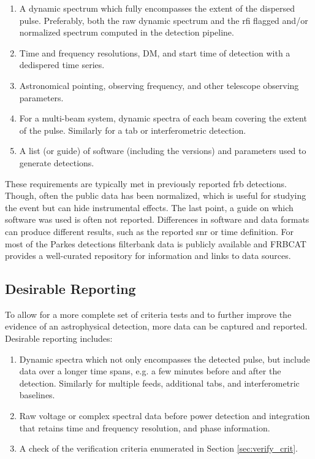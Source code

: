 \documentclass[a4paper,fleqn,usenatbib]{mnras}
\begin{document}
\begin{enumerate}
    \item A dynamic spectrum which fully encompasses the extent of the dispersed
    pulse. Preferably, both the raw dynamic spectrum and the \gls{rfi} flagged
    and/or normalized spectrum computed in the detection pipeline.
    \item Time and frequency resolutions, DM, and start time of detection with a
    dedispered time series.
    \item Astronomical pointing, observing frequency, and other telescope
    observing parameters.
    \item For a multi-beam system, dynamic spectra of each beam covering the
    extent of the pulse. Similarly for a \gls{tab} or interferometric detection.
    \item A list (or guide) of software (including the versions) and parameters used
    to generate detections.
\end{enumerate}


These requirements are typically met in previously reported \gls{frb}
detections. Though, often the public data has been normalized, which is useful
for studying the event but can hide instrumental effects.  The last point,
a guide on which software was used is often not reported.  Differences in
software and data formats can produce different results, such as the reported
\gls{snr} or time definition. For most of the Parkes detections filterbank data
is publicly available and FRBCAT \citep{2016PASA...33...45P} provides a
well-curated repository for information and links to data sources.

\subsection{Desirable Reporting}

To allow for a more complete set of criteria tests and to further improve the
evidence of an astrophysical detection, more data can be captured and reported.
Desirable reporting includes:


\begin{enumerate}
    \item Dynamic spectra which not only encompasses the detected pulse, but
    include data over a longer time spans, e.g. a few minutes before and after
    the detection. Similarly for multiple feeds, additional \glspl{tab}, and
    interferometric baselines.
    \item Raw voltage or complex spectral data before power detection and
    integration that retains time and frequency resolution, and phase
    information.
    \item A check of the verification criteria enumerated in Section
    \ref{sec:verify_crit}.
\end{enumerate}
\end{document}

